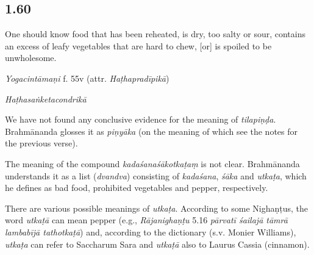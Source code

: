 \begin{ekdosis}
\subsection*{1.60}
\begin{translation}[hp01_060]
One should know food that has been reheated, is dry, too salty or sour, contains an excess of leafy vegetables that are hard to chew, [or] is spoiled to be unwholesome.
\end{translation}


\begin{testimonia}[hp01_060]
\emph{Yogacintāmaṇi} f. 55v (attr. \emph{Haṭhapradīpikā})

\begin{versinnote}
\end{versinnote}

\emph{Haṭhasaṅketacondrikā}

\begin{versinnote}
\end{versinnote}

\end{testimonia}

\begin{philcomm}[hp01_060]
We have not found any conclusive evidence for the meaning of \emph{tilapiṇḍa}. Brahmānanda glosses it as \emph{piṇyāka} (on the meaning of which see the notes for the previous verse).

The meaning of the compound \emph{kadaśanaśākotkaṭaṃ} is not clear. Brahmānanda understands it as a list (\emph{dvandva}) consisting of \emph{kadaśana}, \emph{śāka} and \emph{utkaṭa}, which he defines as bad food, prohibited vegetables and pepper, respectively.

There are various possible meanings of \emph{utkaṭa}. According to some Nighaṇṭus, the word \emph{utkaṭā} can mean pepper  (e.g., \emph{Rājanighaṇṭu} 5.16 \emph{pārvatī śailajā tāmrā lambabījā tathotkaṭā}) and, according to the dictionary (s.v. Monier Williams), \emph{utkaṭa} can refer to Saccharum Sara and \emph{utkaṭā} also to Laurus Cassia (cinnamon). 


\end{philcomm}
\end{ekdosis}
